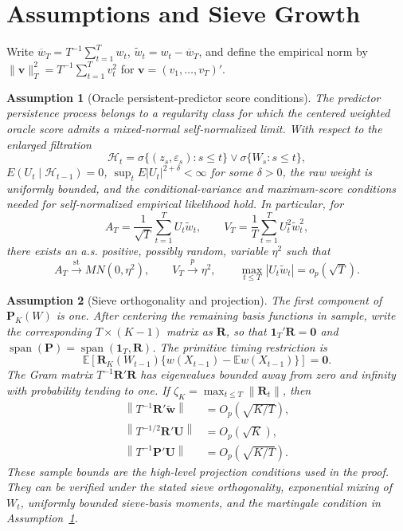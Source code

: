 \documentclass[11pt]{article}
\newtheorem{assumption}{Assumption}
\begin{document}
\section{Assumptions and Sieve Growth}

Write \(\overline w_T=T^{-1}\sum_{t=1}^T w_t\), \(\widetilde w_t=w_t-\overline w_T\), and define the empirical norm by \(\|\bm v\|_T^2=T^{-1}\sum_{t=1}^T v_t^2\) for \(\bm v=(v_1,\ldots,v_T)'\).

\begin{assumption}[Oracle persistent-predictor score conditions]
\label{ass:paper-score}
The predictor persistence process belongs to a regularity class for which the centered weighted oracle score admits a mixed-normal self-normalized limit. With respect to the enlarged filtration
\[
    \mathcal H_t=\sigma\{(z_s,\varepsilon_s):s\leq t\}\vee\sigma\{W_s:s\leq t\},
\]
\(E(U_t\mid\mathcal H_{t-1})=0\), \(\sup_tE|U_t|^{2+\delta}<\infty\) for some \(\delta>0\), the raw weight is uniformly bounded, and the conditional-variance and maximum-score conditions needed for self-normalized empirical likelihood hold. In particular, for
\[
    A_T=\frac1{\sqrt T}\sum_{t=1}^T U_t\widetilde w_t,
    \qquad
    V_T=\frac1T\sum_{t=1}^T U_t^2\widetilde w_t^2,
\]
there exists an a.s. positive, possibly random, variable \(\eta^2\) such that
\begin{equation}
    A_T\xrightarrow{\mathrm{st}}MN(0,\eta^2),
    \qquad
    V_T\xrightarrow{p}\eta^2,
    \qquad
    \max_{t\leq T}|U_t\widetilde w_t|=o_p(\sqrt T).
    \label{eq:paper-oracle}
\end{equation}
\end{assumption}

\begin{assumption}[Sieve orthogonality and projection]
\label{ass:paper-projection}
The first component of \(\bm P_K(W)\) is one. After centering the remaining basis functions in sample, write the corresponding \(T\times(K-1)\) matrix as \(\bm R\), so that \(\bm1_T'\bm R=\bm0\) and \(\operatorname{span}(\bm P)=\operatorname{span}(\bm1_T,\bm R)\). The primitive timing restriction is
\[
    \mathbb E\left[\bm R_K(W_{t-1})\{w(X_{t-1})-\mathbb Ew(X_{t-1})\}\right]=\bm0.
\]
The Gram matrix \(T^{-1}\bm R'\bm R\) has eigenvalues bounded away from zero and infinity with probability tending to one. If \(\zeta_K=\max_{t\leq T}\|\bm R_t\|\), then
\begin{align}
    \left\|T^{-1}\bm R'\widetilde{\bm w}\right\|&=O_p(\sqrt{K/T}),
      \label{eq:paper-rate-rw}\\
    \left\|T^{-1/2}\bm R'\bm U\right\|&=O_p(\sqrt K),
      \label{eq:paper-rate-ru}\\
    \left\|T^{-1}\bm P'\bm U\right\|&=O_p(\sqrt{K/T}).
      \label{eq:paper-rate-pu}
\end{align}
These sample bounds are the high-level projection conditions used in the proof. They can be verified under the stated sieve orthogonality, exponential mixing of \(W_t\), uniformly bounded sieve-basis moments, and the martingale condition in Assumption~\ref{ass:paper-score}.
\end{assumption}
\end{document}
